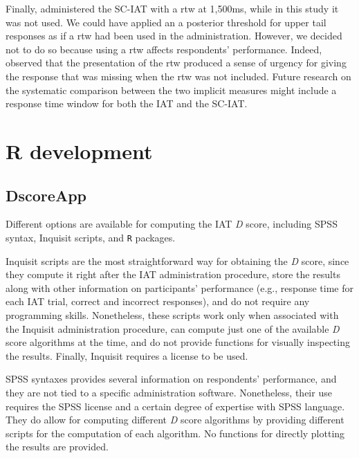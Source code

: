 \documentclass[12pt]{book}
\begin{document}
Finally,  administered the SC-IAT with a rtw at 1,500ms, while in this study it was not used. We could have applied an a posterior threshold for upper tail responses as if a rtw had been used in the administration. However, we decided not to do so because using a rtw affects respondents’ performance. Indeed,  observed that the presentation of the rtw produced a sense of urgency for giving the response that was missing when the rtw was not included. Future research on the systematic comparison between the two implicit measures might include a response time window for both the IAT and the SC-IAT.


\section{R development}
\subsection{DscoreApp}\label{sec:dscoreapp}


Different options are available for computing the IAT \emph{D} score, including SPSS syntax, Inquisit scripts, and \texttt{R} packages. 

Inquisit scripts are  the most straightforward way for obtaining the \emph{D} score, since they compute it right after the IAT administration procedure, store the results along with other information on participants' performance (e.g., response time for each IAT trial, correct and incorrect responses), and do not require any programming skills. Nonetheless, these scripts work only when associated with the Inquisit administration procedure, can compute just one of the available \emph{D} score algorithms at the time, and do not provide functions for visually inspecting the results. Finally, Inquisit requires a license to be used. 

SPSS syntaxes provides several information on respondents' performance, and they are not tied to a specific administration software. Nonetheless, their use requires the SPSS license and a certain degree of expertise with SPSS language. They do allow for computing different \emph{D} score algorithms by providing different scripts for the computation of each algorithm. No functions for directly plotting the results are provided.
\end{document}
